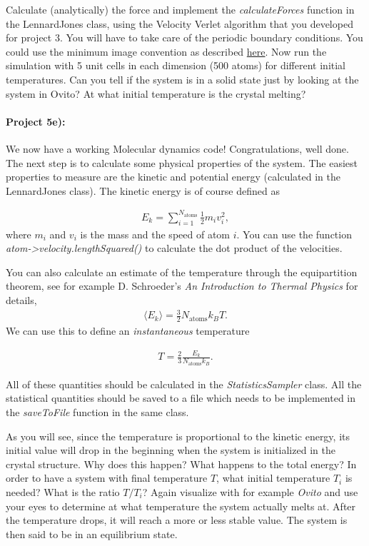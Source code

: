 \documentclass[%
oneside,                 %
final,                   %
10pt]{article}
\begin{document}
Calculate (analytically) the force and implement the \emph{calculateForces} function in the LennardJones class, using the Velocity Verlet algorithm that you developed for project 3. You will have to take care of the periodic boundary conditions. You could use the minimum image convention as described \href{{http://en.wikipedia.org/wiki/Periodic_boundary_conditions}}{here}. Now run the simulation with 5 unit cells in each dimension (500 atoms) for different initial temperatures. Can you tell if the system is in a solid state just by looking at the system in Ovito? At what initial temperature is the crystal melting?

\paragraph{Project 5e):}
We now have a working Molecular dynamics code! Congratulations, well done. The next step is to calculate some physical properties of the system. The easiest properties to measure are the kinetic and potential energy (calculated in the LennardJones class). The kinetic energy is of course defined as

\begin{align}
	E_k = \sum_{i=1}^{N_\text{atoms}} \frac{1}{2} m_i v_i^2,
\end{align}
where $m_i$ and $v_i$ is the mass and the speed of atom $i$. You can use the function \emph{atom->velocity.lengthSquared()} to calculate the dot product of the velocities. 

You can also calculate an estimate of the temperature through the equipartition theorem, see for example D. Schroeder's \emph{An Introduction to Thermal Physics} for details,
\begin{align}
	\langle E_k \rangle = \frac{3}{2}N_\text{atoms} k_B T.
\end{align}
We can use this to define an \emph{instantaneous} temperature

\begin{align}
	T = \frac{2}{3}\frac{E_k}{N_\text{atoms} k_B}.
\end{align}

All of these quantities should be calculated in the \emph{StatisticsSampler} class. All the statistical quantities should be saved to a file which needs to be implemented in the \emph{saveToFile} function in the same class. 

As you will see, since the temperature is proportional to the kinetic energy, its initial value will drop in the beginning when the system is initialized in the crystal structure. Why does this happen? What happens to the total energy? In order to have a system with final temperature $T$, what initial temperature $T_i$ is needed? What is the ratio $T/T_i$? Again visualize with for example \emph{Ovito} and use your eyes to determine at what temperature the system actually melts at. After the temperature drops, it will reach a more or less stable value. The system is then said to be in an equilibrium state.
\end{document}

